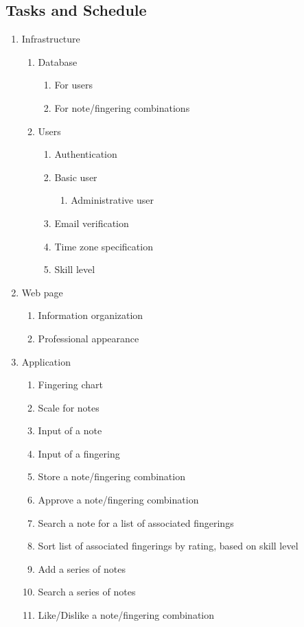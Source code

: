 \documentclass[12pt,english]{article}
\begin{document}
\subsection{Tasks and Schedule}
\begin{enumerate}
\item Infrastructure 
\begin{enumerate}
\item Database 
\begin{enumerate}
\item For users 
\item For note/fingering combinations 
\end{enumerate}
\item Users 
\begin{enumerate}
\item Authentication 
\item Basic user 
\begin{enumerate}
\item Administrative user 
\end{enumerate}
\item Email verification 
\item Time zone specification 
\item Skill level 
\end{enumerate}
\end{enumerate}
\item Web page 
\begin{enumerate}
\item Information organization 
\item Professional appearance 
\end{enumerate}
\item Application 
\begin{enumerate}
\item Fingering chart 
\item Scale for notes 
\item Input of a note 
\item Input of a fingering 
\item Store a note/fingering combination 
\item Approve a note/fingering combination 
\item Search a note for a list of associated fingerings 
\item Sort list of associated fingerings by rating, based on skill level 
\item Add a series of notes 
\item Search a series of notes 
\item Like/Dislike a note/fingering combination 
\end{enumerate}
\end{enumerate}
\end{document}
